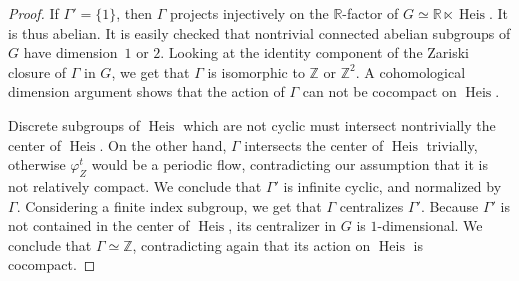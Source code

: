 \documentclass[11pt]{article}
\theoremstyle{definition}
\numberwithin{equation}{section}
\numberwithin{figure}{section}
\numberwithin{table}{section}
\DeclareMathOperator{\Heis}{Heis}
\newcommand*\RR{\mathbb{R}}
\newcommand*\ZZ{\mathbb{Z}}
\begin{document}
\begin{proof}
If $\Gamma'= \{1 \}$, then $\Gamma$ projects injectively on the $\RR$-factor of $G\simeq \RR \ltimes \Heis$. It is thus abelian. It is easily checked that nontrivial connected abelian subgroups of $G$ have dimension~$1$ or $2$. Looking at the identity component of the Zariski closure of $\Gamma$ in $G$, we get that $\Gamma$ is isomorphic to $\ZZ$ or $\ZZ^2$. A cohomological dimension argument shows that the action of $\Gamma$ can not be cocompact on $\Heis$.

Discrete subgroups of $\Heis$ which are not cyclic must intersect nontrivially the center of $\Heis$. On the other hand, $\Gamma$ intersects the center of $\Heis$ trivially, otherwise $\varphi_Z^t$ would be a periodic flow, contradicting our assumption that it is not relatively compact. We conclude that $\Gamma'$ is infinite cyclic, and normalized by $\Gamma$. Considering a finite index subgroup, we get that $\Gamma$ centralizes $\Gamma'$. Because $\Gamma'$ is not contained in the center of $\Heis$, its centralizer in $G$ is $1$-dimensional. We conclude that $\Gamma \simeq \ZZ$, contradicting again that its action on $\Heis$ is cocompact.
\end{proof}
\end{document}
